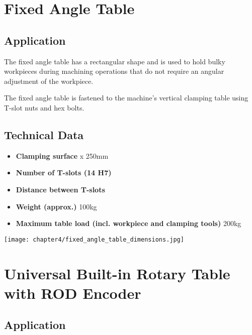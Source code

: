 
\section{Fixed Angle Table}

\subsection*{Application}
The fixed angle table has a rectangular shape and is used to hold bulky workpieces during machining operations that do not require an angular adjustment of the workpiece.

The fixed angle table is fastened to the machine’s vertical clamping table using T-slot nuts and hex bolts.

\subsection*{Technical Data}

\begin{itemize}
   \item \textbf{Clamping surface}  x 250mm
   \item \textbf{Number of T-slots (14 H7)} 
   \item \textbf{Distance between T-slots} \dotfill 63mm
   \item \textbf{Weight (approx.)} \dotfill 100kg
   \item \textbf{Maximum table load (incl. workpiece and clamping tools)} \dotfill 200kg
\end{itemize}



\vspace{3cm}

\begin{center}
    \texttt{[image: chapter4/fixed\_angle\_table\_dimensions.jpg]}    
\end{center}

\section{Universal Built-in Rotary Table with ROD Encoder}

\setcounter{section}{3}

\subsection*{Application}

